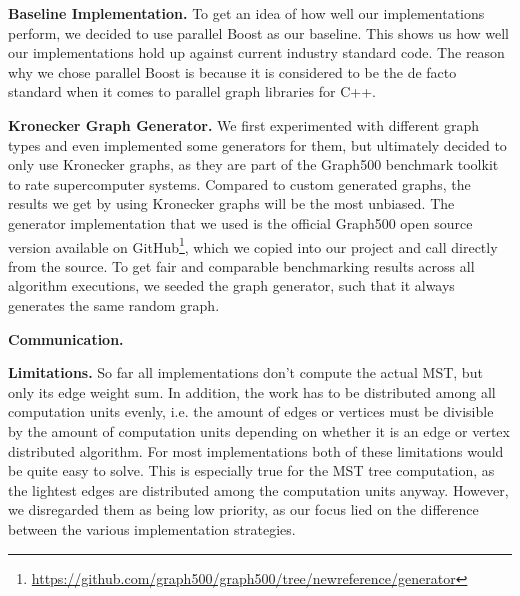\documentclass[letterpaper]{article}
\newcommand{\mypar}[1]{{\bf #1.}}
\begin{document}
\mypar{Baseline Implementation}
To get an idea of how well our implementations perform, we decided to use parallel Boost as our baseline. This shows us
how well our implementations hold up against current industry standard code. The reason why we chose parallel Boost is
because it is considered to be the de facto standard when it comes to parallel graph libraries for C++.

\mypar{Kronecker Graph Generator}
We first experimented with different graph types and even implemented some generators for them, but ultimately decided
to only use Kronecker graphs, as they are part of the Graph500 benchmark toolkit to rate supercomputer systems. Compared
to custom generated graphs, the results we get by using Kronecker graphs will be the most unbiased. The generator
implementation that we used is the official Graph500 open source version available on
GitHub\footnote{\url{https://github.com/graph500/graph500/tree/newreference/generator}}, which we copied into our
project and call directly from the source. To get fair and comparable benchmarking results across all algorithm
executions, we seeded the graph generator, such that it always generates the same random graph.

\mypar{Communication}

\mypar{Limitations}
So far all implementations don't compute the actual MST, but only its edge weight sum. In addition, the work has to be
distributed among all computation units evenly, i.e. the amount of edges or vertices must be divisible by the amount of
computation units depending on whether it is an edge or vertex distributed algorithm. For most implementations both of
these limitations would be quite easy to solve. This is especially true for the MST tree computation, as the lightest
edges are distributed among the computation units anyway. However, we disregarded them as being low priority, as our
focus lied on the difference between the various implementation strategies.
\end{document}

